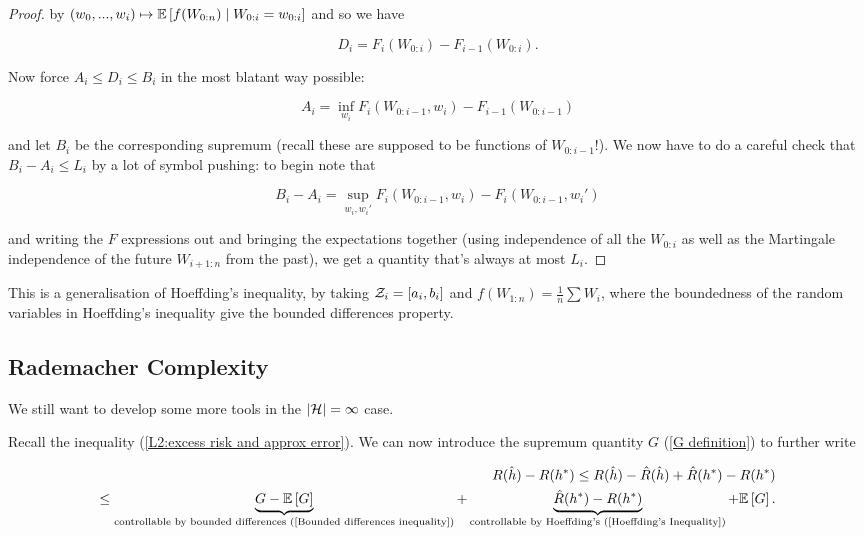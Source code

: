 \documentclass[11pt]{scrartcl}
\begin{document}
\begin{theorem}
\begin{proof}
by $(w_0, ... , w_i) \mapsto \mathbb{E} \left[ f(W_{0:n}) \mid W_{0:i} = w_{0:i} \right]$ and so we have

\begin{equation}
    D_i = F_i(W_{0:i}) - F_{i-1}(W_{0:i}).
\end{equation}

Now force $A_i \le D_i \le B_i$ in the most blatant way possible:

\begin{equation}
    A_i = \inf_{w_i} F_i(W_{0:i-1},w_i) - F_{i-1}(W_{0:i-1})
\end{equation}

and let $B_i$ be the corresponding supremum (recall these are supposed to be functions of $W_{0:i-1}$!). We now have to do a careful check that $B_i - A_i \le L_i$ by a lot of symbol pushing: to begin note that 

\begin{equation}
    B_i - A_i = \sup_{w_i, w_i'} F_i(W_{0:i-1}, w_i) - F_i(W_{0:i-1}, w_i')
\end{equation}

and writing the $F$ expressions out and bringing the expectations together (using independence of all the $W_{0:i}$ as well as the Martingale independence of the future $W_{i+1:n}$ from the past), we get a quantity that's always at most $L_i$.


\end{proof}
\end{theorem}

This is a generalisation of Hoeffding's inequality, by taking $\mathcal{Z}_i = [a_i, b_i]$ and $f(W_{1:n}) = \frac1n \sum W_i$, where the boundedness of the random variables in Hoeffding's inequality give the bounded differences property.

\subsection{Rademacher Complexity}

We still want to develop some more tools in the $|\mathcal{H}| = \infty$ case.

Recall the inequality (\ref{L2:excess risk and approx error}). We can now introduce the supremum quantity $G$ (\ref{G definition}) to further write

\begin{align}
    R(\hat{h}) - R(h^*) \le R(\hat{h}) - \hat{R}(\hat{h}) + \hat{R}(h^*) - R(h^*) \\
    \le \underbrace{G - \mathbb{E} \left[ G \right]}_{\text{controllable by bounded differences (\ref{Bounded differences inequality})}} + \underbrace{\hat{R}(h^*) - R(h^*)}_{\text{controllable by Hoeffding's (\ref{Hoeffding's Inequality})}} + \mathbb{E} \left[ G \right].
\end{align}
\end{document}

